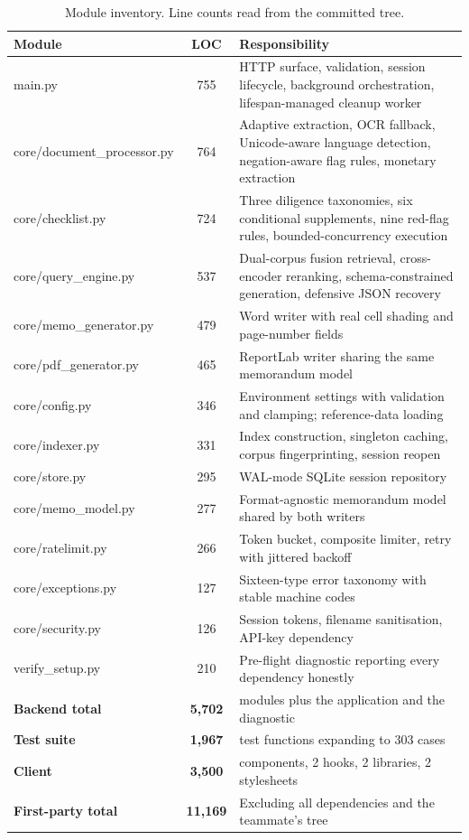 \documentclass[11pt,a4paper]{article}
\begin{document}
\begin{table}[H]
\centering\footnotesize
\begin{tabularx}{\linewidth}{@{}>{\ttfamily}l c X@{}}
\toprule
\rowcolor{mist}\normalfont\textbf{Module} & \textbf{LOC} & \textbf{Responsibility} \\
\midrule
main.py                   & 755 & HTTP surface, validation, session lifecycle, background orchestration, lifespan-managed cleanup worker \\
core/document\_processor.py & 764 & Adaptive extraction, OCR fallback, Unicode-aware language detection, negation-aware flag rules, monetary extraction \\
core/checklist.py         & 724 & Three diligence taxonomies, six conditional supplements, nine red-flag rules, bounded-concurrency execution \\
core/query\_engine.py     & 537 & Dual-corpus fusion retrieval, cross-encoder reranking, schema-constrained generation, defensive JSON recovery \\
core/memo\_generator.py   & 479 & Word writer with real cell shading and page-number fields \\
core/pdf\_generator.py    & 465 & ReportLab writer sharing the same memorandum model \\
core/config.py            & 346 & Environment settings with validation and clamping; reference-data loading \\
core/indexer.py           & 331 & Index construction, singleton caching, corpus fingerprinting, session reopen \\
core/store.py             & 295 & WAL-mode SQLite session repository \\
core/memo\_model.py       & 277 & Format-agnostic memorandum model shared by both writers \\
core/ratelimit.py         & 266 & Token bucket, composite limiter, retry with jittered backoff \\
core/exceptions.py        & 127 & Sixteen-type error taxonomy with stable machine codes \\
core/security.py          & 126 & Session tokens, filename sanitisation, API-key dependency \\
verify\_setup.py          & 210 & Pre-flight diagnostic reporting every dependency honestly \\
\midrule
\normalfont\textbf{Backend total} & \textbf{5{,}702} & \normalfont 13 modules plus the application and the diagnostic \\
\normalfont\textbf{Test suite}    & \textbf{1{,}967} & \normalfont 241 test functions expanding to 303 cases \\
\normalfont\textbf{Client}        & \textbf{3{,}500} & \normalfont 8 components, 2 hooks, 2 libraries, 2 stylesheets \\
\midrule
\rowcolor{mist}\normalfont\textbf{First-party total} & \textbf{11{,}169} & \normalfont Excluding all dependencies and the teammate's tree \\
\bottomrule
\end{tabularx}
\caption{Module inventory. Line counts read from the committed tree.}
\end{table}
\end{document}

